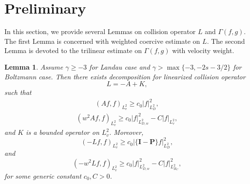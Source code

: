 \documentclass[reqno,a4paper]{amsart}
\newtheorem{Lem}[Thm]{Lemma}
\numberwithin{equation}{section}
\newcommand{\1}{\mathbf{1}}
\renewcommand{\P}{\mathbf{P}}
\newcommand{\<}{\langle}
\renewcommand{\>}{\rangle}
\newcommand{\I}{\mathbf{I}}
\renewcommand{\P}{\mathbf{P}}
\begin{document}
\section{Preliminary}\label{Sec2}
In this section, we provide several Lemmas on collision operator $L$ and $\Gamma(f,g)$. The first Lemma is concerned with weighted coercive estimate on $L$. The second Lemma is devoted to the trilinear estimate on $\Gamma(f,g)$ with velocity weight. 

\begin{Lem}
\label{L2}Assume $\gamma\ge -3$ for Landau case and $\gamma>\max\{-3,-2s-3/2\}$ for Boltzmann case. Then there exists decomposition for linearized collision operator
	\begin{equation*}
		L = -A+K,
	\end{equation*}such that 
\begin{align}\label{estiAK}
	(Af,f)_{L^2_v} \ge c_0|f|_{L^2_D}^2,
\end{align}	
\begin{align}\label{estiAK1}
(w^2Af,f)_{L^2_v} \ge c_0|f|_{L^2_{D,w}}^2-C|f|_{L^2_v},
\end{align}	
and $K$ is a bounded operator on $L^2_v$. Moreover, 
\begin{equation}
	\label{L}
	(-Lf,f)_{L^2_v}\ge c_0|\{\I-\P\}f|_{L^2_D}^2,
\end{equation}
and 
\begin{equation}\label{LL}
	(-w^2Lf,f)_{L^2_v}\ge c_0|f|_{L^2_{D,w}}^2- C|f|^2_{L^2_{B_C}},
\end{equation}
for some generic constant $c_0,C>0$.
\end{Lem}
\end{document}
